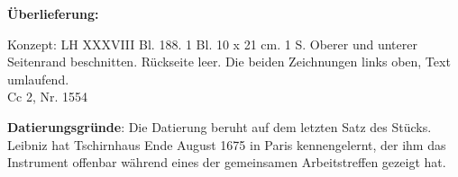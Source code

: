    
        
        \begin{ledgroupsized}[r]{120mm}
        \footnotesize 
        \pstart        
        \noindent\textbf{\"{U}berlieferung:}  
        \pend
        \end{ledgroupsized}
      
       
              \begin{ledgroupsized}[r]{114mm}
              \footnotesize 
              \pstart \parindent -6mm
              Konzept: LH XXXVIII Bl. 188. 1 Bl. 10 x 21 cm. 1 S. Oberer und unterer Seitenrand beschnitten. R\"{u}ckseite leer. Die beiden Zeichnungen links oben, Text umlaufend.\\Cc 2, Nr. 1554 \pend
              \end{ledgroupsized}
        \vspace*{5mm}
        \begin{ledgroup}
        \footnotesize 
        \pstart
      \noindent\footnotesize{\textbf{Datierungsgr\"{u}nde}: Die Datierung beruht auf dem letzten Satz des St\"{u}cks. Leibniz hat Tschirn\-haus Ende August 1675 in Paris kennengelernt, der ihm das Instrument offenbar w\"{a}hrend eines der gemeinsamen Arbeitstreffen gezeigt hat.}
        \pend
        \end{ledgroup}
      
